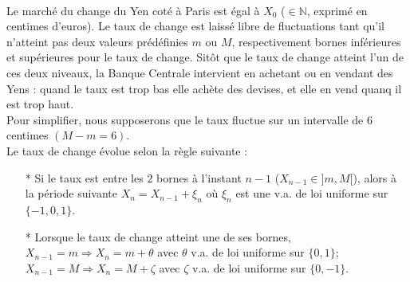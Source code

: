 \documentclass[11pt]{exam}
\begin{document}
\begin{questions}
\\
Le marché du change du Yen coté à Paris est égal à $X_0$ ($\in \mathbb{N}$, exprimé en centimes d'euros). Le taux de change est laissé libre de fluctuations tant qu'il n'atteint pas deux valeurs prédéfinies $m$ ou $M$, respectivement bornes inférieures et supérieures pour le taux de change. Sitôt que le taux de change atteint l'un de ces deux niveaux, la Banque Centrale intervient en achetant ou en vendant des Yens : quand le taux est trop bas elle achète des devises, et elle en vend quanq il est trop haut.\\
Pour simplifier, nous supposerons que le taux fluctue sur un intervalle de $6$ centimes $(M-m=6)$.\\
Le taux de change évolue selon la règle suivante :
\begin{itemize}
\item[*] Si le taux est entre les $2$ bornes à l'instant $n-1$ ($X_{n-1}\in ]m,M[$), alors à la période suivante $X_n=X_{n-1}+\xi_n$ où $\xi_n$ est une v.a. de loi uniforme sur $\{-1,0,1\}$.
\item[*] Lorsque le taux de change atteint une de ses bornes,\\
$X_{n-1}=m \Rightarrow X_n=m+\theta$ avec $\theta$ v.a. de loi uniforme sur $\{0,1\}$;\\
$X_{n-1}=M \Rightarrow X_n=M+\zeta$ avec $\zeta$ v.a. de loi uniforme sur $\{0,-1\}$.
\end{itemize}
\end{questions}
\end{document}
